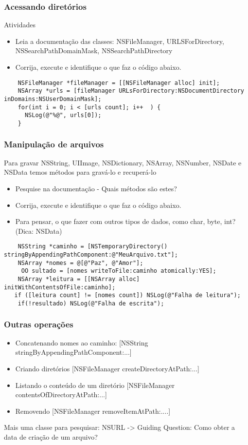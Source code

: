 \documentclass[serif,mathserif]{beamer}
\begin{document}
\begin{frame}[fragile]
  \frametitle{Acessando diretórios}
  Atividades
  \begin{itemize}
  \item Leia a documentação das classes: NSFileManager, URLSForDirectory, NSSearchPathDomainMask, NSSearchPathDirectory 
  \item Corrija, execute e identifique o que faz o código abaixo.
  \end{itemize}
  \begin{lstlisting}    
    NSFileManager *fileManager = [[NSFileManager alloc] init];
    NSArray *urls = [fileManager URLsForDirectory:NSDocumentDirectory inDomains:NSUserDomainMask];
    for(int i = 0; i < [urls count]; i++  ) {
      NSLog(@"%@", urls[0]);
    }
  \end{lstlisting}  
\end{frame}

\begin{frame}[fragile]
  \frametitle{Manipulação de arquivos}
  Para gravar NSString, UIImage, NSDictionary, NSArray, NSNumber, NSDate e NSData temos métodos para gravá-lo e recuperá-lo
  \begin{itemize}
    \item Pesquise na documentação - Quais métodos são estes?
    \item Corrija, execute e identifique o que faz o código abaixo.   
    \item Para pensar, o que fazer com outros tipos de dados, como char, byte, int? (Dica: NSData) 
  \end{itemize}
  \begin{lstlisting}
    NSString *caminho = [NSTemporaryDirectory() stringByAppendingPathComponent:@"MeuArquivo.txt"];
    NSArray *nomes = @[@"Paz", @"Amor"];
     OO sultado = [nomes writeToFile:caminho atomically:YES];
    NSArray *leitura = [[NSArray alloc] initWithContentsOfFile:caminho];
   if ([leitura count] != [nomes count]) NSLog(@"Falha de leitura");
    if(!resultado) NSLog(@"Falha de escrita");
  \end{lstlisting}
\end{frame}

\begin{frame}
  \frametitle{Outras operações}
    \begin{itemize}
     \item Concatenando nomes ao caminho: [NSString stringByAppendingPathComponent:...]
     \item Criando diretórios [NSFileManager createDirectoryAtPath:...]
     \item Listando o conteúdo de um diretório [NSFileManager contentsOfDirectoryAtPath:...]
     \item Removendo [NSFileManager removeItemAtPath:....]
    \end{itemize}
    Mais uma classe para pesquisar: NSURL -> Guiding Question: Como obter a data de criação de um arquivo?
\end{frame}  
\end{document}
